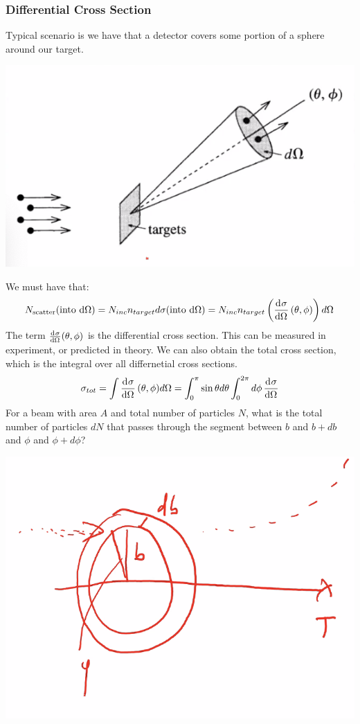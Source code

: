\subsubsection{Differential Cross Section}
Typical scenario is we have that a detector covers some portion of a sphere around our target.
\begin{center}
    \includegraphics[scale=0.8]{Lecture-27/l27-img8.png}
\end{center}
We must have that:
\[N_{\text{scatter}}(\text{into d$\Omega$}) = N_{inc}n_{target}d\sigma(\text{into d$\Omega$}) = N_{inc}n_{target}\left(\dod{\sigma}{\Omega}(\theta, \phi)\right)d\Omega\]
The term $\od{\sigma}{\Omega}(\theta, \phi)$ is the differential cross section. This can be measured in experiment, or predicted in theory. We can also obtain the total cross section, which is the integral over all differnetial cross sections.
\[\sigma_{tot} = \int \dod{\sigma}{\Omega}(\theta, \phi) d\Omega = \int_0^\pi \sin\theta d\theta \int
_0^{2\pi}d\phi\dod{\sigma}{\Omega}\]
For a beam with area $A$ and total number of particles $N$, what is the total number of particles $dN$ that passes through the segment between $b$ and $b + db$ and $\phi$ and $\phi + d\phi$?
\begin{center}
    \includegraphics[scale=0.7]{Lecture-27/l27-img9.png}
\end{center}
